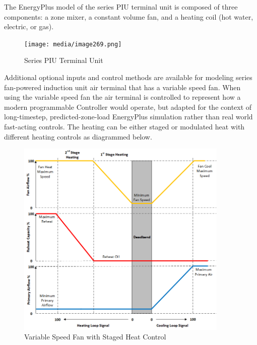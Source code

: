 The EnergyPlus model of the series PIU terminal unit is composed of three components: a zone mixer, a constant volume fan, and a heating coil (hot water, electric, or gas).

\begin{figure}[hbtp] %
\centering
\texttt{[image: media/image269.png]}
\caption{Series PIU Terminal Unit \protect \label{fig:series-piu-terminal-unit}}
\end{figure}

Additional optional inputs and control methods are available for modeling series fan-powered induction unit air terminal that has a variable speed fan. When using the variable speed fan the air terminal is controlled to represent how a modern programmable Controller would operate, but adapted for the context of long-timestep, predicted-zone-load EnergyPlus simulation rather than real world fast-acting controls.  The heating can be either staged or modulated heat with different heating controls as diagrammed below.

\begin{figure}[hbtp] %
\centering
\includegraphics[width=0.9\textwidth, height=0.9\textheight, keepaspectratio=true]{media/VSFanStagedHeatControlDiag.png}
\caption{Variable Speed Fan with Staged Heat Control \protect \label{fig:series-piu-terminal-unit-VS-staged-heat}}
\end{figure}

